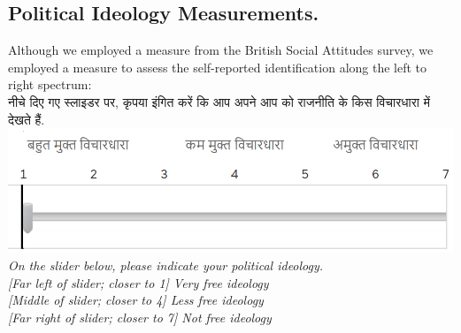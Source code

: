 \documentclass[empirical, authordate, issue]{jote-new-article}
\begin{document}
\clearpage
\subsection{ Political Ideology Measurements. }

Although we employed a measure from the British Social Attitudes survey, we employed a measure to assess the self-reported identification along the left to right spectrum: \\
नीचे दिए गए स्लाइडर पर, कृपया इंगित करें कि आप अपने आप को राजनीति के किस विचारधारा में देखते हैं.\\

\includegraphics[width=\linewidth]{media/supplement/images-2.jpeg}
\emph{On the slider below, please indicate your political ideology.}\\
\emph{[Far left of slider; closer to 1] Very free ideology}\\
\emph{[Middle of slider; closer to 4] Less free ideology}\\
\emph{[Far right of slider; closer to 7] Not free ideology }
\end{document}
